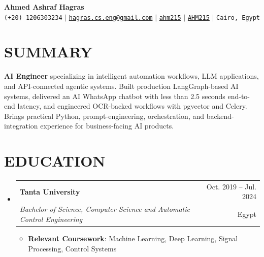 \documentclass[letterpaper,11pt]{article}
\makeatletter
\newcommand{\resumeItem}[1]{
  \item\small{
    {#1 \vspace{-1pt}}
  }
}
\newcommand{\resumeSubheading}[4]{
  \vspace{-1pt}\item
    \begin{tabular*}{\textwidth}[t]{l@{\extracolsep{\fill}}r}
      \textbf{#1} & {\color{dark-grey}\small #2}\vspace{1pt}\\
      \textit{#3} & {\color{dark-grey} \small #4}\\
    \end{tabular*}\vspace{-4pt}
}
\newcommand{\resumeSubHeadingListStart}{\begin{itemize}[leftmargin=0in, label={}]}
\newcommand{\resumeSubHeadingListEnd}{\end{itemize}}
\newcommand{\resumeItemListStart}{\begin{itemize}}
\newcommand{\resumeItemListEnd}{\end{itemize}\vspace{0pt}}
\makeatother
\begin{document}
\begin{center}
    \textbf{\Huge Ahmed Ashraf Hagras} \\ \vspace{5pt}
    \small \faPhone* \texttt{(+20) 1206303234} \hspace{1pt} $|$
    \hspace{1pt} \faEnvelope \hspace{2pt} \href{mailto:hagras.cs.eng@gmail.com}{\texttt{hagras.cs.eng@gmail.com}} \hspace{1pt} $|$
    \hspace{1pt} \faLinkedin \hspace{2pt} \href{https://www.linkedin.com/in/ahm215}{\texttt{ahm215}} \hspace{1pt} $|$
    \hspace{1pt} \faGithub \hspace{2pt} \href{https://github.com/AHM215}{\texttt{AHM215}} \hspace{1pt} $|$
    \hspace{1pt} \faMapMarker* \hspace{2pt}\texttt{Cairo, Egypt}
    \\ \vspace{-3pt}
\end{center}

\section{SUMMARY}
\small{
\textbf{AI Engineer} specializing in intelligent automation workflows, LLM applications, and API-connected agentic systems. Built production LangGraph-based AI systems, delivered an AI WhatsApp chatbot with less than 2.5 seconds end-to-end latency, and engineered OCR-backed workflows with pgvector and Celery. Brings practical Python, prompt-engineering, orchestration, and backend-integration experience for business-facing AI products.
}

\section{EDUCATION}
  \resumeSubHeadingListStart
    \resumeSubheading
      {Tanta University}{Oct. 2019 -- Jul. 2024}
      {Bachelor of Science, Computer Science and Automatic Control Engineering}{Egypt}
      \resumeItemListStart
        \resumeItem{\textbf{Relevant Coursework}: Machine Learning, Deep Learning, Signal Processing, Control Systems}
      \resumeItemListEnd
  \resumeSubHeadingListEnd
\end{document}
